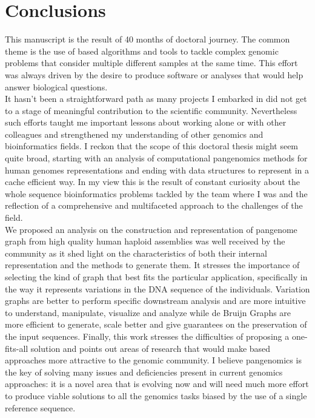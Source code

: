 \chapter{Conclusions}
\label{sec:conclusions}
This manuscript is the result of 40 months of doctoral journey. The common theme is the use of \kmer based algorithms and tools to tackle complex genomic problems that consider multiple different samples at the same time. This effort was always driven by the desire to produce software or analyses that would help answer biological questions.\\
It hasn’t been a straightforward path as many projects I embarked in did not get to a stage of meaningful contribution to the scientific community. Nevertheless such efforts taught me important lessons about working alone or with other colleagues and strengthened my understanding of other genomics and bioinformatics fields.
I reckon that the scope of this doctoral thesis might seem quite broad, starting with an analysis of computational pangenomics methods for human genomes representations and ending with data structures to represent \kmers in a cache efficient way. In my view this is the result of constant curiosity about the whole sequence bioinformatics problems tackled by the team where I was and the reflection of a comprehensive and multifaceted approach to the challenges of the field.\\
We proposed an analysis on the construction and representation of pangenome graph from high quality human haploid assemblies was well received by the community as it shed light on the characteristics of both their internal representation and the methods to generate them. It stresses the importance of selecting the kind of graph that best fits the particular application, specifically in the way it represents variations in the DNA sequence of the individuals. Variation graphs are better to perform specific downstream analysis and are more intuitive to understand, manipulate, visualize and analyze while de Bruijn Graphs are more efficient to generate, scale better and give guarantees on the preservation of the input sequences. Finally, this work stresses the difficulties of proposing a one-fits-all solution and points out areas of research that would make \kmer based approaches more attractive to the genomic community. I believe pangenomics is the key of solving many issues and deficiencies present in current genomics approaches: it is a novel area that is evolving now and will need much more effort to produce viable solutions to all the genomics tasks biased by the use of a single reference sequence.\\
